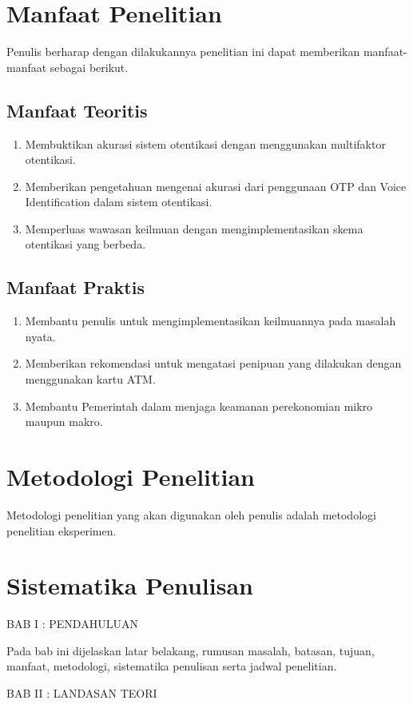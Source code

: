 \section{Manfaat Penelitian}
Penulis berharap dengan dilakukannya penelitian ini dapat memberikan manfaat-manfaat sebagai berikut.
\subsection{Manfaat Teoritis}
\begin{enumerate}
	\item Membuktikan akurasi sistem otentikasi dengan menggunakan multifaktor otentikasi.
	\item Memberikan pengetahuan mengenai akurasi dari penggunaan OTP dan Voice Identification dalam sistem otentikasi.
	\item Memperluas wawasan keilmuan dengan mengimplementasikan skema otentikasi yang berbeda.
\end{enumerate}
\subsection{Manfaat Praktis}
\begin{enumerate}
	\item Membantu penulis untuk mengimplementasikan keilmuannya pada masalah nyata.
	\item Memberikan rekomendasi untuk mengatasi penipuan yang dilakukan dengan menggunakan kartu ATM.
	\item Membantu Pemerintah dalam menjaga keamanan perekonomian mikro maupun makro.
\end{enumerate}

\section{Metodologi Penelitian}

Metodologi penelitian yang akan digunakan oleh penulis adalah metodologi penelitian eksperimen. 

\section{Sistematika Penulisan}
BAB I : PENDAHULUAN

Pada bab ini dijelaskan latar belakang, rumusan masalah, batasan, tujuan, manfaat, metodologi, sistematika penulisan serta jadwal penelitian.

BAB II : LANDASAN TEORI

